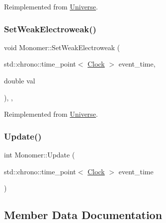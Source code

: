 Reimplemented from \mbox{\hyperlink{classUniverse_a0f5cd04081b41ee931c0557dc397f6fb}{Universe}}.

\mbox{\label{classMonomer_ab887d7cfd2ecb557efb3ace59852019c}} 
\subsubsection{\texorpdfstring{Set\+Weak\+Electroweak()}{SetWeakElectroweak()}}
{\footnotesize\ttfamily void Monomer\+::\+Set\+Weak\+Electroweak (\begin{DoxyParamCaption}\item[{std\+::chrono\+::time\+\_\+point$<$ \mbox{\hyperlink{universe_8h_a0ef8d951d1ca5ab3cfaf7ab4c7a6fd80}{Clock}} $>$}]{event\+\_\+time,  }\item[{double}]{val }\end{DoxyParamCaption})\hspace{0.3cm}{\ttfamily [inline]}, {\ttfamily [final]}, {\ttfamily [virtual]}}



Reimplemented from \mbox{\hyperlink{classUniverse_a2d3d642bfdc863248e93535832fa4b00}{Universe}}.

\mbox{\label{classMonomer_a48dc2ffb5da8cf3dc3f4f56bba674de6}} 
\subsubsection{\texorpdfstring{Update()}{Update()}}
{\footnotesize\ttfamily int Monomer\+::\+Update (\begin{DoxyParamCaption}\item[{std\+::chrono\+::time\+\_\+point$<$ \mbox{\hyperlink{universe_8h_a0ef8d951d1ca5ab3cfaf7ab4c7a6fd80}{Clock}} $>$}]{event\+\_\+time }\end{DoxyParamCaption})}



\subsection{Member Data Documentation}
\mbox{\label{classMonomer_aaba064b94b15cdafaa5da341a97b7a7f}} 
